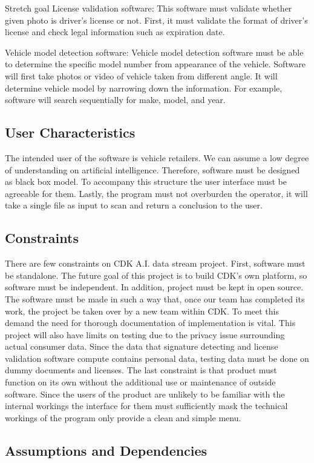 \documentclass[onecolumn, draftclsnofoot,10pt, compsoc]{IEEEtran}
\begin{document}
Stretch goal
License validation software: This software must validate whether given photo is driver’s license or not. First, it must validate the format of driver’s license and check legal information such as expiration date.

Vehicle model detection software: Vehicle model detection software must be able to determine the specific model number from appearance of the vehicle. Software will first take photos or video of vehicle taken from different angle. It will determine vehicle model by narrowing down the information. For example, software will search sequentially for make, model, and year.

\subsection{User Characteristics}
The intended user of the software is vehicle retailers. We can assume a low degree of understanding on artificial intelligence. Therefore, software must be designed as black box model. To accompany this structure the user interface must be agreeable for them. Lastly, the program must not overburden the operator, it will take a single file as input to scan and return a conclusion to the user.


\subsection{Constraints}
There are few constraints on CDK A.I. data stream project. First, software must be standalone. The future goal of this project is to build CDK’s own platform, so software must be independent. In addition, project must be kept in open source. The software must be made in such a way that, once our team has completed its work, the project be taken over by a new team within CDK. To meet this demand the need for thorough documentation of implementation is vital. This project will also have limits on testing due to the privacy issue surrounding actual consumer data. Since the data that signature detecting and license validation software compute contains personal data, testing data must be done on dummy documents and licenses. The last constraint is that product must function on its own without the additional use or maintenance of outside software. Since the users of the product are unlikely to be familiar with the internal workings the interface for them must sufficiently mask the technical workings of the program only provide a clean and simple menu.

\subsection{Assumptions and Dependencies}
\end{document}
